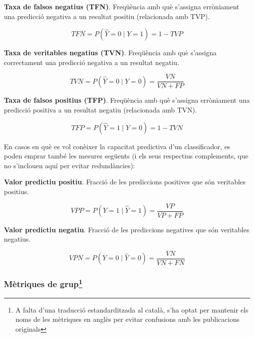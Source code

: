 \documentclass[CAT]{TFUOC}%
\begin{document}
\textbf{Taxa de falsos negatius (TFN)}. Freqüència amb què s'assigna erròniament una predicció negativa a un resultat positiu (relacionada amb TVP).

\begin{equation}
TFN = P(\hat Y = 0 \mid Y = 1) = 1 - TVP
\end{equation}

\textbf{Taxa de veritables negatius (TVN)}. Freqüència amb què s'assigna correctament una predicció negativa a un resultat negatiu.

\begin{equation}
TVN = P(\hat Y = 0 \mid Y = 0) = \frac{VN}{VN + FP}
\end{equation}

\textbf{Taxa de falsos positius (TFP)}. Freqüència amb què s'assigna erròniament una predicció positiva a un resultat negatiu (relacionada amb TVN).

\begin{equation}
TFP = P(\hat Y = 1 \mid Y = 0) = 1 - TVN
\end{equation}

En casos en què es vol conèixer la capacitat predictiva d'un classificador, es poden emprar també les mesures següents (i els seus respectius complements, que no s'inclouen aquí per evitar redundàncies):

\bigskip

\textbf{Valor predictiu positiu}. Fracció de les prediccions positives que són veritables positius.

\begin{equation}
VPP = P(Y = 1 \mid \hat Y = 1) = \frac{VP}{VP + FP}
\end{equation}

\textbf{Valor predictiu negatiu}. Fracció de les prediccions negatives que són veritables negatius.

\begin{equation}
VPN = P(Y = 0 \mid \hat Y = 0) = \frac{VN}{VN + FN}
\end{equation}

\subsubsection[Mètriques de grup]{\texorpdfstring{Mètriques de grup\footnote{A falta d'una traducció estandarditzada al català, s'ha optat per mantenir els noms de les mètriques en anglès per evitar confusions amb les publicacions originals}}{Mètriques de grup}}\label{muxe8triques-de-grup1}
\end{document}
